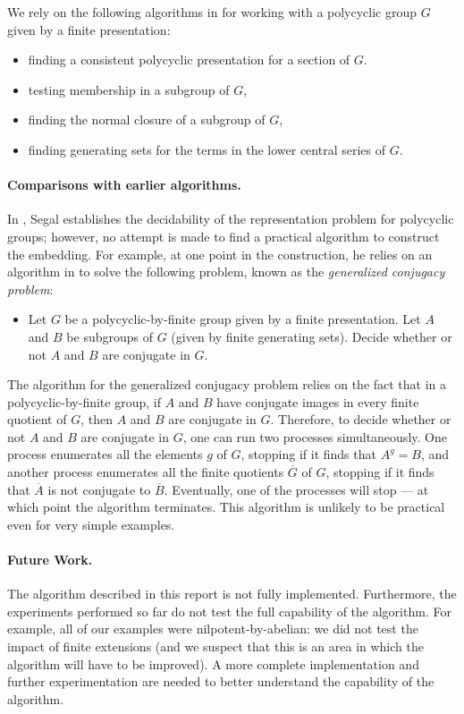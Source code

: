 \sloppy
We rely on the following algorithms 
in \cite{Sims}
for working with a polycyclic group $G$ given by a finite
presentation:
\begin{itemize}
\item finding a consistent polycyclic presentation for 
a section of $G$.
\item testing membership in a subgroup of $G$,
\item finding the normal closure of a subgroup of $G$,
\item finding generating sets for the terms in the lower central
series of $G$.
\end{itemize}

\paragraph{Comparisons with earlier algorithms.}
In \cite{Segal:paper}, Segal establishes the decidability
of the representation problem for polycyclic groups;
however, no attempt is made to find a practical
algorithm to construct the embedding.
For example, at one point in the construction, he
relies on an algorithm in \cite{BCRS} to solve the following problem,
known as the {\em generalized conjugacy problem}:
\begin{itemize}
\item Let $G$ be a polycyclic-by-finite group given by a finite
presentation.  Let $A$ and $B$ be subgroups of $G$ 
(given by finite generating sets).  Decide whether or
not $A$ and $B$ are conjugate in $G$.
\end{itemize}
The algorithm for the generalized conjugacy problem relies on 
the fact that in a polycyclic-by-finite group,
if $A$ and $B$ have conjugate images in every finite
quotient of $G$,
then $A$ and $B$ are conjugate in $G$.
Therefore, to decide whether or not $A$ and $B$
are conjugate in $G$, one can run two processes
simultaneously.
One process enumerates all the elements $g$ of $G$,
stopping if it finds that $A^g = B$,
and another process enumerates all the finite quotients $\overline{G}$
of $G$, stopping if it finds that $\overline{A}$ is not conjugate
to $\overline{B}$.
Eventually, one of the processes will stop --- at which 
point the algorithm terminates.
This algorithm is unlikely to
be practical even for very simple examples.

\paragraph{Future Work.}
The algorithm described in this report is not fully 
implemented.
Furthermore, the experiments performed so far do
not test the full capability of the algorithm.
For example, all of our examples were nilpotent-by-abelian:
we did not test the impact of finite extensions 
(and we suspect that this is an area in which the
algorithm will have to be improved).
A more complete implementation and further experimentation 
are needed to better understand the capability of the algorithm.

